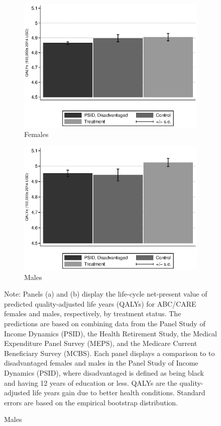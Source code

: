 \begin{figure}[!htbp]
\centering
\caption{Quality Adjusted Life Years, Predictions and Comparison to PSID}\label{fig:qalys}
\begin{subfigure}[h]{0.4\textwidth}
		\centering
		\caption{Females} \label{fig:qabcare1}
		\includegraphics[width=\textwidth]{output/qalyexppsid_0.eps}
\end{subfigure}%
\begin{subfigure}[h]{0.4\textwidth}
	\centering
	\caption{Males} \label{fig:qpsid1}
		\includegraphics[width=\textwidth]{output/qalyexppsid_1.eps}
\end{subfigure}
\footnotesize \justify
Note: Panels (a) and (b) display the life-cycle net-present value of predicted quality-adjusted life years (QALYs) for ABC/CARE females and males, respectively, by treatment status. The predictions are based on combining data from the Panel Study of Income Dynamics (PSID), the Health Retirement Study, the Medical Expenditure Panel Survey (MEPS), and the Medicare Current Beneficiary Survey (MCBS). Each panel displays a comparison to to disadvantaged females and males in the Panel Study of Income Dynamics (PSID), where disadvantaged is defined as being black and having 12 years of education or less. QALYs are the quality-adjusted life years gain due to better health conditions. Standard errors are based on the empirical bootstrap distribution.\\
\end{figure}

